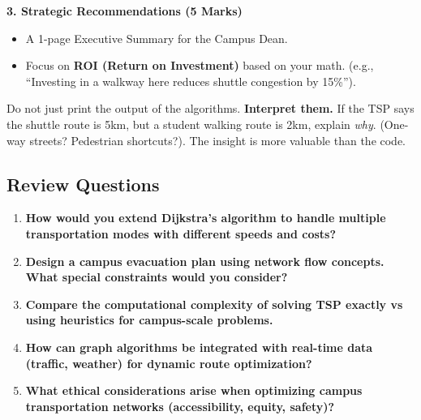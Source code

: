 \documentclass[
  letterpaper,
  DIV=11,
  numbers=noendperiod]{scrreprt}
\providecommand{\tightlist}{%
  \setlength{\itemsep}{0pt}\setlength{\parskip}{0pt}}
\begin{document}
\textbf{3. Strategic Recommendations (5 Marks)}

\begin{itemize}
\tightlist
\item
  A 1-page Executive Summary for the Campus Dean.
\item
  Focus on \textbf{ROI (Return on Investment)} based on your math.
  (e.g., ``Investing in a walkway here reduces shuttle congestion by
  15\%'').
\end{itemize}

\begin{tcolorbox}[enhanced jigsaw, leftrule=.75mm, rightrule=.15mm, colback=white, colbacktitle=quarto-callout-important-color!10!white, arc=.35mm, opacityback=0, toptitle=1mm, bottomrule=.15mm, bottomtitle=1mm, titlerule=0mm, title=\textcolor{quarto-callout-important-color}{\faExclamation}\hspace{0.5em}{Final Tip}, toprule=.15mm, left=2mm, coltitle=black, breakable, colframe=quarto-callout-important-color-frame, opacitybacktitle=0.6]

Do not just print the output of the algorithms. \textbf{Interpret them.}
If the TSP says the shuttle route is 5km, but a student walking route is
2km, explain \emph{why}. (One-way streets? Pedestrian shortcuts?). The
insight is more valuable than the code.

\end{tcolorbox}

\subsection{Review Questions}\label{review-questions-15}

\begin{enumerate}
\def\labelenumi{\arabic{enumi}.}
\item
  \textbf{How would you extend Dijkstra's algorithm to handle multiple
  transportation modes with different speeds and costs?}
\item
  \textbf{Design a campus evacuation plan using network flow concepts.
  What special constraints would you consider?}
\item
  \textbf{Compare the computational complexity of solving TSP exactly vs
  using heuristics for campus-scale problems.}
\item
  \textbf{How can graph algorithms be integrated with real-time data
  (traffic, weather) for dynamic route optimization?}
\item
  \textbf{What ethical considerations arise when optimizing campus
  transportation networks (accessibility, equity, safety)?}
\end{enumerate}
\end{document}
